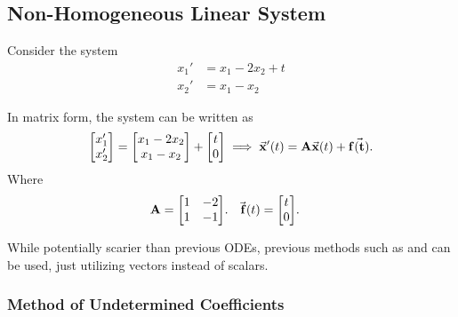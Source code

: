 \documentclass[../notes.tex]{subfiles}
\begin{document}
\subsection{Non-Homogeneous Linear System}

Consider the system
\begin{align*}
    x_1' &= x_1 - 2x_2 + t \\
    x_2' &= x_1 - x_2 
\end{align*}

In matrix form, the system can be written as
\[
    \mqty[x_1' \\ x_2'] = \mqty[x_1 - 2x_2 \\ x_1 - x_2] + \mqty[t \\ 0] \implies \va{x}'(t) = \vb{A} \va{x}(t) + \va{f(t)}
.\] 
Where
\begin{align*}
    & \vb{A} = \mqty[1 & -2 \\ 1 & -1]. & \va{f}(t) = \mqty[t \\ 0] &
.\end{align*}

While potentially scarier than previous ODEs, previous methods such as  and  can be used, just utilizing vectors instead of scalars.

\subsubsection{Method of Undetermined Coefficients}
\end{document}
